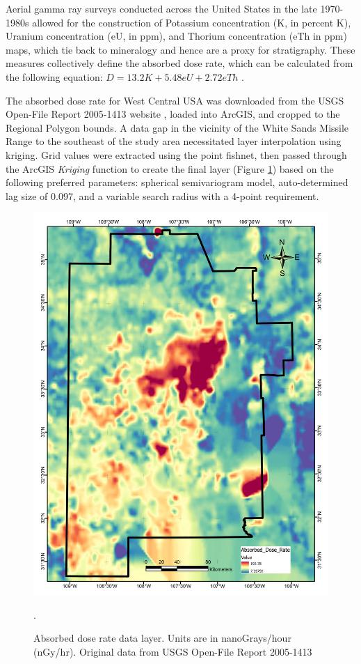 Aerial gamma ray surveys conducted across the United States in the late 1970-1980s allowed for the construction of Potassium concentration (K, in percent K), Uranium concentration (eU, in ppm), and Thorium concentration (eTh in ppm) maps, which tie back to mineralogy and hence are a proxy for stratigraphy. These measures collectively define the absorbed dose rate, which can be calculated from the following equation: $D = 13.2 K + 5.48 eU + 2.72 eTh$ \citep{duval_terrestrial_2005}.

The absorbed dose rate for West Central USA was downloaded from the USGS Open-File Report 2005-1413 website \citep{duval_terrestrial_2005}, loaded into ArcGIS, and cropped to the Regional Polygon bounds. A data gap in the vicinity of the White Sands Missile Range to the southeast of the study area necessitated layer interpolation using kriging. Grid values were extracted using the point fishnet, then passed through the ArcGIS \textit{Kriging} function to create the final layer (Figure \ref{fig:feat_gamma}) based on the following preferred parameters: spherical semivariogram model, auto-determined lag size of 0.097, and a variable search radius with a 4-point requirement.

\begin{figure}[!htp]
\centering
\includegraphics[scale=.50]{templates/images/Figure-AbsorbedDose.pdf}
\caption[Absorbed dose rate data layer]{Absorbed dose rate data layer. Units are in nanoGrays/hour (nGy/hr). Original data from USGS Open-File Report 2005-1413 \protect\citep{duval_terrestrial_2005}}.
\label{fig:feat_gamma}
\end{figure}

